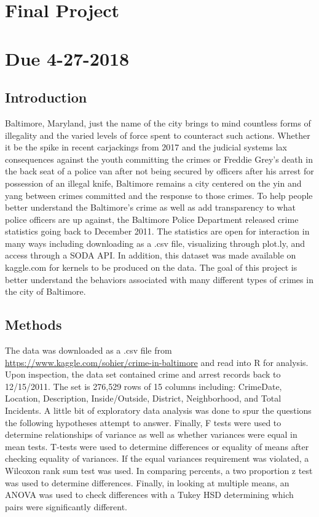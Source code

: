 \documentclass{article}
\newlength\tindent
\renewcommand{\indent}{\hspace*{\tindent}}
\begin{document}
\section*{Final Project}
\section*{Due 4-27-2018}
\subsection*{Introduction}

\indent Baltimore, Maryland, just the name of the city brings to mind countless forms of illegality and the varied levels of force spent to counteract such actions.  Whether it be the spike in recent carjackings from 2017 and the judicial systems lax consequences against the youth committing the crimes or Freddie Grey's death in the back seat of a police van after not being secured by officers after his arrest for possession of an illegal knife, Baltimore remains a city centered on the yin and yang between crimes committed and the response to those crimes.  To help people better understand the Baltimore's crime as well as add transparency to what police officers are up against, the Baltimore Police Department released crime statistics going back to December 2011.  The statistics are open for interaction in many ways including downloading as a .csv file, visualizing through plot.ly, and access through a SODA API.  In addition, this dataset was made available on kaggle.com for kernels to be produced on the data.  The goal of this project is better understand the behaviors associated with many different types of crimes in the city of Baltimore.  

\subsection*{Methods}

\indent The data was downloaded as a .csv file from \url{https://www.kaggle.com/sohier/crime-in-baltimore} and read into R for analysis.  Upon inspection, the data set contained crime and arrest records back to 12/15/2011.  The set is 276,529 rows of 15 columns including: CrimeDate, Location, Description, Inside/Outside, District, Neighborhood, and Total Incidents.  A little bit of exploratory data analysis was done to spur the questions the following hypotheses attempt to answer.  Finally, F tests were used to determine relationships of variance as well as whether variances were equal in mean tests.  T-tests were used to determine differences or equality of means after checking equality of variances.  If the equal variances requirement was violated, a Wilcoxon rank sum test was used.  In comparing percents, a two proportion z test was used to determine differences.  Finally, in looking at multiple means, an ANOVA was used to check differences with a Tukey HSD determining which pairs were significantly different.    
\end{document}
